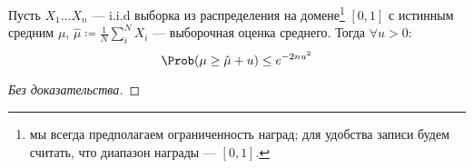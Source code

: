 \begin{theorem}
\setcounter{footnote}{1}
Пусть $X_1 \dots X_n$ --- i.i.d выборка из распределения на домене\footnote{мы всегда предполагаем ограниченность наград; для удобства записи будем считать, что диапазон награды --- $[0, 1]$.} $[0, 1]$ с истинным средним $\mu$, $\hat{\mu} \coloneqq \frac{1}{N} \sum_i^N X_i$ --- выборочная оценка среднего. Тогда $\forall u > 0$:
$$\Prob(\mu \ge \hat{\mu} + u) \le e^{-2nu^2}$$
\begin{proof}[Без доказательства]
\end{proof}

\end{theorem}

